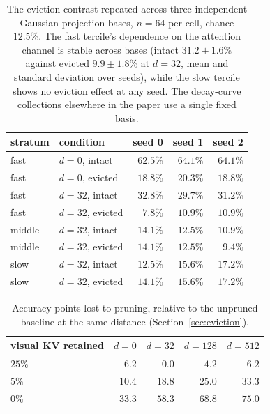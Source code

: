 \documentclass{article}
\begin{document}
\begin{table}[h]
\centering\small
\begin{tabular}{llrrr}
\toprule
stratum & condition & seed 0 & seed 1 & seed 2 \\
\midrule
fast   & $d{=}0$, intact       & $62.5\%$ & $64.1\%$ & $64.1\%$ \\
fast   & $d{=}0$, evicted      & $18.8\%$ & $20.3\%$ & $18.8\%$ \\
fast   & $d{=}32$, intact      & $32.8\%$ & $29.7\%$ & $31.2\%$ \\
fast   & $d{=}32$, evicted     & $7.8\%$  & $10.9\%$ & $10.9\%$ \\
\addlinespace
middle & $d{=}32$, intact      & $14.1\%$ & $12.5\%$ & $10.9\%$ \\
middle & $d{=}32$, evicted     & $14.1\%$ & $12.5\%$ & $9.4\%$  \\
\addlinespace
slow   & $d{=}32$, intact      & $12.5\%$ & $15.6\%$ & $17.2\%$ \\
slow   & $d{=}32$, evicted     & $14.1\%$ & $15.6\%$ & $17.2\%$ \\
\bottomrule
\end{tabular}
\caption{The eviction contrast repeated across three independent Gaussian
projection bases, $n = 64$ per cell, chance $12.5\%$. The fast tercile's
dependence on the attention channel is stable across bases (intact
$31.2 \pm 1.6\%$ against evicted $9.9 \pm 1.8\%$ at $d{=}32$, mean and standard
deviation over seeds), while the slow tercile shows no eviction effect at any
seed. The decay-curve collections elsewhere in the paper use a single fixed
basis.}
\label{tab:seeds}
\end{table}

\begin{table}[h]
\centering\small
\begin{tabular}{lrrrr}
\toprule
visual KV retained & $d{=}0$ & $d{=}32$ & $d{=}128$ & $d{=}512$ \\
\midrule
$25\%$ & $6.2$  & $0.0$  & $4.2$  & $6.2$ \\
$5\%$  & $10.4$ & $18.8$ & $25.0$ & $33.3$ \\
$0\%$  & $33.3$ & $58.3$ & $68.8$ & $75.0$ \\
\bottomrule
\end{tabular}
\caption{Accuracy points lost to pruning, relative to the unpruned baseline at
the same distance (Section~\ref{sec:eviction}).}
\label{tab:eviction_cost}
\end{table}
\end{document}
